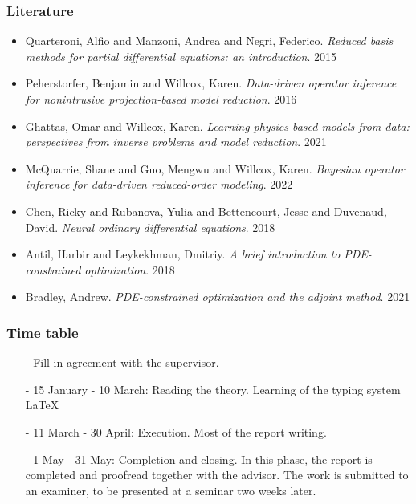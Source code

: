 \documentclass[en,cm,10pt]{inst}
\begin{document}
	\subsubsection*{Literature}
    \begin{itemize}
    
        \item Quarteroni, Alfio and Manzoni, Andrea and Negri, Federico. \textit{Reduced basis methods for partial differential equations: an introduction}. 2015
        \item Peherstorfer, Benjamin and Willcox, Karen. \textit{Data-driven operator inference for nonintrusive projection-based model reduction}. 2016
        \item Ghattas, Omar and Willcox, Karen. \textit{Learning physics-based models from data: perspectives from inverse problems and model reduction}. 2021
        \item McQuarrie, Shane and Guo, Mengwu and Willcox, Karen. \textit{Bayesian operator inference for data-driven reduced-order modeling}. 2022
        \item Chen, Ricky and Rubanova, Yulia and Bettencourt, Jesse and Duvenaud, David. \textit{Neural ordinary differential equations}. 2018
        \item Antil, Harbir and Leykekhman, Dmitriy. \textit{A brief introduction to PDE-constrained optimization}. 2018
        \item Bradley, Andrew. \textit{PDE-constrained optimization and the adjoint method}. 2021
        
    \end{itemize}

    \newpage
	
	\subsubsection*{Time table}
	\begin{itemize}
        \item[-] Fill in agreement with the supervisor.
        \item[-] 15 January - 10 March: Reading the theory. Learning of the typing system LaTeX 
        \item[-] 11 March - 30 April: Execution. Most of the report writing.
        \item[-] 1 May - 31 May: Completion and closing. In this phase, the report is completed and proofread together with the advisor. The work is submitted to an examiner, to be presented at a seminar two weeks later.
    \end{itemize}
	\vspace{0.5cm}
    
\end{document}
